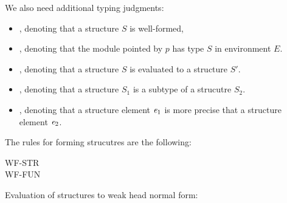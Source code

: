 We also need additional typing judgments: 
\begin{itemize}
\item {}, denoting that a structure $S$ is well-formed, 

\item {}, denoting that the module pointed by $p$ has type $S$ in
environment $E$.

\item {}, denoting that a structure $S$ is evaluated to 
a structure $S'$.

\item {}, denoting that a structure $S_1$ is a subtype of a
strucutre $S_2$.

\item {}, denoting that a structure element
  ${\it e}_1$ is more precise that a structure element ${\it e}_2$.
\end{itemize}
The rules for forming strucutres are the following:
\begin{description}
\item[WF-STR]
\item[WF-FUN]
\end{description}
Evaluation of structures to weak head normal form:
